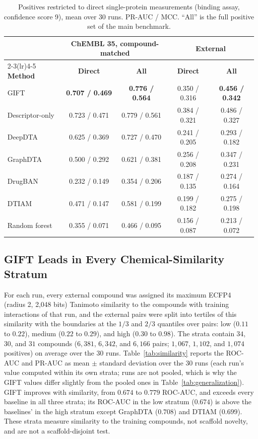 \documentclass[11pt,letterpaper]{article}
\begin{document}
\begin{table}[!t]
\centering
\caption{Positives restricted to direct single-protein measurements (binding assay, confidence score 9), mean over 30 runs. PR-AUC / MCC. ``All'' is the full positive set of the main benchmark.}
\label{tab:direct_target}
\small
\begin{tabular}{lcccc}
\toprule
 & \multicolumn{2}{c}{\textbf{ChEMBL 35, compound-matched}} & \multicolumn{2}{c}{\textbf{External}} \\
\cmidrule(lr){2-3}\cmidrule(lr){4-5}
\textbf{Method} & \textbf{Direct} & \textbf{All} & \textbf{Direct} & \textbf{All} \\
\midrule
GIFT & \textbf{0.707 / 0.469} & \textbf{0.776 / 0.564} & 0.350 / 0.316 & \textbf{0.456 / 0.342} \\
Descriptor-only & 0.723 / 0.471 & 0.779 / 0.561 & 0.384 / 0.321 & 0.486 / 0.327 \\
DeepDTA & 0.625 / 0.369 & 0.727 / 0.470 & 0.241 / 0.205 & 0.293 / 0.182 \\
GraphDTA & 0.500 / 0.292 & 0.621 / 0.381 & 0.256 / 0.208 & 0.347 / 0.231 \\
DrugBAN & 0.232 / 0.149 & 0.354 / 0.206 & 0.187 / 0.135 & 0.274 / 0.164 \\
DTIAM & 0.471 / 0.147 & 0.581 / 0.199 & 0.199 / 0.182 & 0.275 / 0.198 \\
Random forest & 0.355 / 0.071 & 0.466 / 0.095 & 0.156 / 0.087 & 0.213 / 0.072 \\
\bottomrule
\end{tabular}
\end{table}

\subsection{GIFT Leads in Every Chemical-Similarity Stratum}
\label{sec:similarity_strata}
For each run, every external compound was assigned its maximum ECFP4 (radius 2, 2{,}048 bits) Tanimoto similarity to the compounds with training interactions of that run, and the external pairs were split into tertiles of this similarity with the boundaries at the $1/3$ and $2/3$ quantiles over pairs: low ($0.11$ to $0.22$), medium ($0.22$ to $0.29$), and high ($0.30$ to $0.98$). The strata contain $34$, $30$, and $31$ compounds ($6{,}381$, $6{,}342$, and $6{,}166$ pairs; $1{,}067$, $1{,}102$, and $1{,}074$ positives) on average over the 30 runs. Table~\ref{tab:similarity} reports the ROC-AUC and PR-AUC as mean $\pm$ standard deviation over the 30 runs (each run's value computed within its own strata; runs are not pooled, which is why the GIFT values differ slightly from the pooled ones in Table~\ref{tab:generalization}). GIFT improves with similarity, from $0.674$ to $0.779$ ROC-AUC, and exceeds every baseline in all three strata; its ROC-AUC in the low stratum ($0.674$) is above the baselines' in the high stratum except GraphDTA ($0.708$) and DTIAM ($0.699$). These strata measure similarity to the training compounds, not scaffold novelty, and are not a scaffold-disjoint test.
\end{document}
